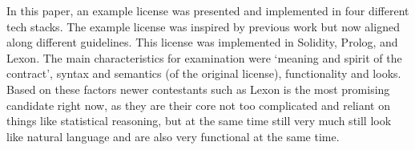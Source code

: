\documentclass[conference]{IEEEtran}
\begin{document}
In this paper, an example license was presented and implemented in four different tech stacks. %
The example license was inspired by previous work but now aligned along different guidelines. This license was implemented in Solidity, Prolog, %
and Lexon. The main characteristics for examination were ‘meaning and spirit of the contract’, syntax and semantics (of the original license), functionality and looks. %
Based on these factors newer contestants such as Lexon %
is the most promising candidate right now, as they are their core not too complicated and reliant on things like statistical reasoning, but at the same time still very much still look like natural language and are also very functional at the same time.%





{}


%
%



\end{document}
